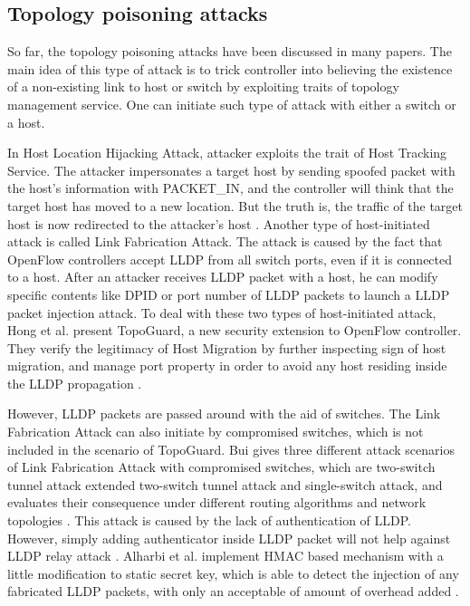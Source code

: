 \subsection{Topology poisoning attacks}
So far, the topology poisoning attacks have been discussed in many papers. The main idea of this type of attack is to trick controller into believing the existence of a non-existing link to host or switch by exploiting traits of topology management service. One can initiate such type of attack with either a switch or a host.

In Host Location Hijacking Attack, attacker exploits the trait of Host Tracking Service. The attacker impersonates a target host by sending spoofed packet with the host's information with PACKET\_IN, and the controller will think that the target host has moved to a new location. But the truth is, the traffic of the target host is now redirected to the attacker's host \cite{HXWG15}. Another type of host-initiated attack is called Link Fabrication Attack. The attack is caused by the fact that OpenFlow controllers accept LLDP from all switch ports, even if it is connected to a host. After an attacker receives LLDP packet with a host, he can modify specific contents like DPID or port number of LLDP packets to launch a LLDP packet injection attack. To deal with these two types of host-initiated attack, Hong et al. present TopoGuard, a new security extension to OpenFlow controller. They verify the legitimacy of Host Migration by further inspecting sign of host migration, and manage port property in order to avoid any host residing inside the LLDP propagation \cite{HXWG15}. 

However, LLDP packets are passed around with the aid of switches. The Link Fabrication Attack can also initiate by compromised switches, which is not included in the scenario of TopoGuard. Bui gives three different attack scenarios of Link Fabrication Attack with compromised switches, which are two-switch tunnel attack extended two-switch tunnel attack and single-switch attack, and evaluates their consequence under different routing algorithms and network topologies \cite{TTB15}. This attack is caused by the lack of authentication of LLDP. However, simply adding authenticator inside LLDP packet will not help against LLDP relay attack \cite{HXWG15}. Alharbi et al. implement HMAC based mechanism with a little modification to static secret key, which is able to detect the injection of any fabricated LLDP packets, with only an acceptable of amount of overhead added \cite{ATPP15}.

